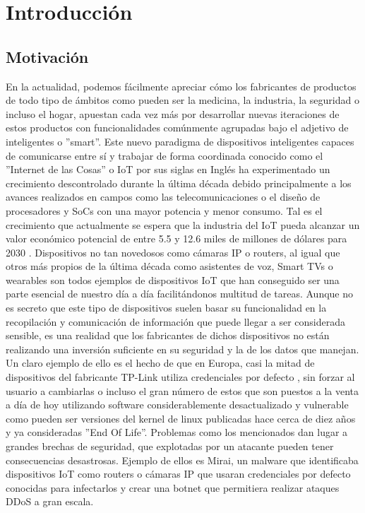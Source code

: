 \chapter{Introducción}

\section{Motivación}
En la actualidad, podemos fácilmente apreciar cómo los fabricantes de productos de todo tipo de
ámbitos como pueden ser la medicina, la industria, la seguridad o incluso el hogar, apuestan cada vez 
más por desarrollar nuevas iteraciones de estos productos con funcionalidades comúnmente agrupadas bajo el 
adjetivo de inteligentes o ''smart''. Este nuevo paradigma de dispositivos inteligentes capaces de 
comunicarse entre sí y trabajar de forma coordinada conocido como el ''Internet de las Cosas'' o IoT por 
sus siglas en Inglés ha experimentado un crecimiento descontrolado durante la última década debido 
principalmente a los avances realizados en campos como las telecomunicaciones o el diseño de procesadores y
SoCs con una mayor potencia y menor consumo. Tal es el crecimiento que actualmente se espera que la industria del
IoT pueda alcanzar un valor económico potencial de entre 5.5 y 12.6 miles de millones de dólares para
2030 \cite{McKinsey}.
\bigskip
Dispositivos no tan novedosos como cámaras IP o routers, al igual que otros más 
propios de la última década como asistentes de voz, Smart TVs o wearables son todos ejemplos 
de dispositivos IoT que han conseguido ser una parte esencial de nuestro día a día facilitándonos
multitud de tareas. Aunque no es secreto que este tipo de dispositivos suelen basar su funcionalidad en 
la recopilación y comunicación de información que puede llegar a ser considerada sensible, es una realidad 
que los fabricantes de dichos dispositivos no están realizando una inversión suficiente en su seguridad y 
la de los datos que manejan. Un claro ejemplo de ello es el hecho de que en Europa, casi la mitad 
de dispositivos del fabricante TP-Link utiliza credenciales por defecto \cite{Deepak}, sin forzar al usuario 
a cambiarlas o incluso el gran número de estos que son puestos a la venta a día de hoy utilizando software 
considerablemente desactualizado y vulnerable como pueden ser versiones del kernel de linux publicadas hace cerca de 
diez años y ya consideradas ''End Of Life''. Problemas como los mencionados dan lugar a grandes brechas de
seguridad, que explotadas por un atacante pueden tener consecuencias desastrosas. Ejemplo de ellos es 
Mirai\cite{mirai}, un malware que identificaba dispositivos IoT como routers o cámaras IP que usaran credenciales 
por defecto conocidas para infectarlos y crear una botnet que permitiera realizar ataques DDoS a gran escala.\\

